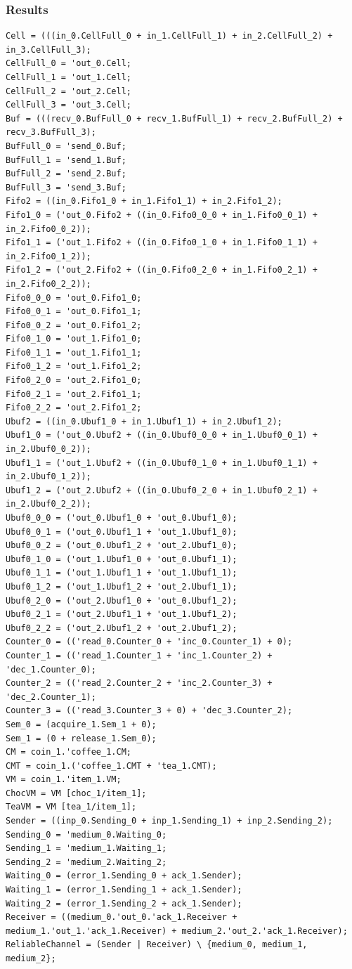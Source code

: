\documentclass[t]{beamer}
\begin{document}

\begin{frame}[fragile]
  \frametitle{Results}

  \begin{lstlisting}[language={}, basicstyle=\ttfamily\tiny]
Cell = (((in_0.CellFull_0 + in_1.CellFull_1) + in_2.CellFull_2) + in_3.CellFull_3);
CellFull_0 = 'out_0.Cell;
CellFull_1 = 'out_1.Cell;
CellFull_2 = 'out_2.Cell;
CellFull_3 = 'out_3.Cell;
Buf = (((recv_0.BufFull_0 + recv_1.BufFull_1) + recv_2.BufFull_2) + recv_3.BufFull_3);
BufFull_0 = 'send_0.Buf;
BufFull_1 = 'send_1.Buf;
BufFull_2 = 'send_2.Buf;
BufFull_3 = 'send_3.Buf;
Fifo2 = ((in_0.Fifo1_0 + in_1.Fifo1_1) + in_2.Fifo1_2);
Fifo1_0 = ('out_0.Fifo2 + ((in_0.Fifo0_0_0 + in_1.Fifo0_0_1) + in_2.Fifo0_0_2));
Fifo1_1 = ('out_1.Fifo2 + ((in_0.Fifo0_1_0 + in_1.Fifo0_1_1) + in_2.Fifo0_1_2));
Fifo1_2 = ('out_2.Fifo2 + ((in_0.Fifo0_2_0 + in_1.Fifo0_2_1) + in_2.Fifo0_2_2));
Fifo0_0_0 = 'out_0.Fifo1_0;
Fifo0_0_1 = 'out_0.Fifo1_1;
Fifo0_0_2 = 'out_0.Fifo1_2;
Fifo0_1_0 = 'out_1.Fifo1_0;
Fifo0_1_1 = 'out_1.Fifo1_1;
Fifo0_1_2 = 'out_1.Fifo1_2;
Fifo0_2_0 = 'out_2.Fifo1_0;
Fifo0_2_1 = 'out_2.Fifo1_1;
Fifo0_2_2 = 'out_2.Fifo1_2;
Ubuf2 = ((in_0.Ubuf1_0 + in_1.Ubuf1_1) + in_2.Ubuf1_2);
Ubuf1_0 = ('out_0.Ubuf2 + ((in_0.Ubuf0_0_0 + in_1.Ubuf0_0_1) + in_2.Ubuf0_0_2));
Ubuf1_1 = ('out_1.Ubuf2 + ((in_0.Ubuf0_1_0 + in_1.Ubuf0_1_1) + in_2.Ubuf0_1_2));
Ubuf1_2 = ('out_2.Ubuf2 + ((in_0.Ubuf0_2_0 + in_1.Ubuf0_2_1) + in_2.Ubuf0_2_2));
Ubuf0_0_0 = ('out_0.Ubuf1_0 + 'out_0.Ubuf1_0);
Ubuf0_0_1 = ('out_0.Ubuf1_1 + 'out_1.Ubuf1_0);
Ubuf0_0_2 = ('out_0.Ubuf1_2 + 'out_2.Ubuf1_0);
Ubuf0_1_0 = ('out_1.Ubuf1_0 + 'out_0.Ubuf1_1);
Ubuf0_1_1 = ('out_1.Ubuf1_1 + 'out_1.Ubuf1_1);
Ubuf0_1_2 = ('out_1.Ubuf1_2 + 'out_2.Ubuf1_1);
Ubuf0_2_0 = ('out_2.Ubuf1_0 + 'out_0.Ubuf1_2);
Ubuf0_2_1 = ('out_2.Ubuf1_1 + 'out_1.Ubuf1_2);
Ubuf0_2_2 = ('out_2.Ubuf1_2 + 'out_2.Ubuf1_2);
Counter_0 = (('read_0.Counter_0 + 'inc_0.Counter_1) + 0);
Counter_1 = (('read_1.Counter_1 + 'inc_1.Counter_2) + 'dec_1.Counter_0);
Counter_2 = (('read_2.Counter_2 + 'inc_2.Counter_3) + 'dec_2.Counter_1);
Counter_3 = (('read_3.Counter_3 + 0) + 'dec_3.Counter_2);
Sem_0 = (acquire_1.Sem_1 + 0);
Sem_1 = (0 + release_1.Sem_0);
CM = coin_1.'coffee_1.CM;
CMT = coin_1.('coffee_1.CMT + 'tea_1.CMT);
VM = coin_1.'item_1.VM;
ChocVM = VM [choc_1/item_1];
TeaVM = VM [tea_1/item_1];
Sender = ((inp_0.Sending_0 + inp_1.Sending_1) + inp_2.Sending_2);
Sending_0 = 'medium_0.Waiting_0;
Sending_1 = 'medium_1.Waiting_1;
Sending_2 = 'medium_2.Waiting_2;
Waiting_0 = (error_1.Sending_0 + ack_1.Sender);
Waiting_1 = (error_1.Sending_1 + ack_1.Sender);
Waiting_2 = (error_1.Sending_2 + ack_1.Sender);
Receiver = ((medium_0.'out_0.'ack_1.Receiver + medium_1.'out_1.'ack_1.Receiver) + medium_2.'out_2.'ack_1.Receiver);
ReliableChannel = (Sender | Receiver) \ {medium_0, medium_1, medium_2};
  \end{lstlisting}

\end{frame}
\end{document}
